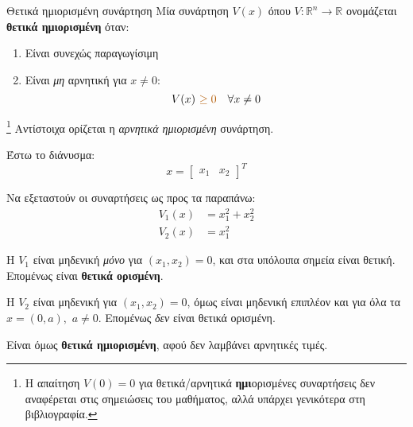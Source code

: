 \documentclass[11pt,a4paper,notitlepage,fleqn]{article}
\begin{document}
\begin{defn}{Θετικά ημιορισμένη συνάρτηση}{}
	Μία συνάρτηση \( V(x) \) όπου \( V: \mathbb R^n \to \mathbb R \) ονομάζεται \textbf{θετικά
		ημιορισμένη} όταν:
	\begin{enumerate}
		\item Είναι συνεχώς παραγωγίσιμη
		\item Είναι {\color{orange!70!black}\textit{μη} αρνητική} για \( x\neq 0 \):
		\[
		V(x) ~ {\color{orange!70!black}\geq 0} \quad \forall x\neq 0
		\]
		
	\end{enumerate}
\end{defn}\footnote{Η απαίτηση \( V(0) = 0 \) για θετικά/αρνητικά \textbf{ημι}ορισμένες συναρτήσεις δεν αναφέρεται στις σημειώσεις του
μαθήματος, αλλά υπάρχει γενικότερα στη βιβλιογραφία.}
Αντίστοιχα ορίζεται η \textit{αρνητικά ημιορισμένη} συνάρτηση.

\begin{exercise}[Παράδειγμα]
	Έστω το διάνυσμα:
	\[
	x = \left[\begin{matrix}
	x_1 & x_2
	\end{matrix}\right]^T
	\]
	
	Να εξεταστούν οι συναρτήσεις ως προς τα παραπάνω:
	\begin{align*}
		V_1(x) &= x_1^2 + x_2^2 \\
		V_2(x) &= x_1^2
	\end{align*}
	\tcblower
	\begin{enumparen}
		\item Η \( V_1 \) είναι μηδενική \textit{μόνο} για \( (x_1,x_2) = 0 \),
		και στα υπόλοιπα σημεία είναι θετική. Επομένως είναι \textbf{θετικά ορισμένη}.
		\item Η \( V_2 \) είναι μηδενική για \( (x_1,x_2) = 0\), όμως είναι μηδενική επιπλέον και για όλα
		τα \( x= (0,a), \) \quad \( a \neq 0 \). Επομένως \textit{δεν} είναι θετικά ορισμένη.
		
		Είναι όμως \textbf{θετικά ημιορισμένη}, αφού δεν λαμβάνει
		αρνητικές τιμές.
	\end{enumparen}
\end{exercise}
\end{document}
